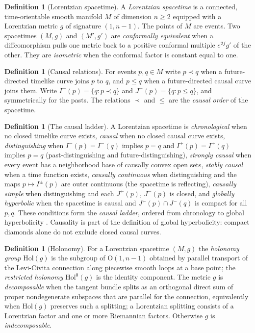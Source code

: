 \documentclass[11pt,letterpaper]{article}
\theoremstyle{definition}
\newtheorem{definition}[theorem]{Definition}
\theoremstyle{remark}
\begin{document}
\begin{definition}[Lorentzian spacetime]\label{def:spacetime}
A \emph{Lorentzian spacetime} is a connected, time-orientable smooth manifold $M$ of dimension $n \ge 2$ equipped with a Lorentzian metric $g$ of signature $(1, n-1)$. The points of $M$ are events. Two spacetimes $(M,g)$ and $(M',g')$ are \emph{conformally equivalent} when a diffeomorphism pulls one metric back to a positive conformal multiple $e^{2f} g'$ of the other. They are \emph{isometric} when the conformal factor is constant equal to one.
\end{definition}

\begin{definition}[Causal relations]\label{def:causal}
For events $p, q \in M$ write $p \prec q$ when a future-directed timelike curve joins $p$ to $q$, and $p \le q$ when a future-directed causal curve joins them. Write $I^+(p) = \{ q : p \prec q \}$ and $J^+(p) = \{ q : p \le q \}$, and symmetrically for the pasts. The relations $\prec$ and $\le$ are the \emph{causal order} of the spacetime.
\end{definition}

\begin{definition}[The causal ladder]\label{def:ladder}
A Lorentzian spacetime is \emph{chronological} when no closed timelike curve exists, \emph{causal} when no closed causal curve exists, \emph{distinguishing} when $I^-(p) = I^-(q)$ implies $p = q$ and $I^+(p) = I^+(q)$ implies $p = q$ (past-distinguishing and future-distinguishing), \emph{strongly causal} when every event has a neighborhood base of causally convex open sets, \emph{stably causal} when a time function exists, \emph{causally continuous} when distinguishing and the maps $p \mapsto I^{\pm}(p)$ are outer continuous (the spacetime is reflecting), \emph{causally simple} when distinguishing and each $J^+(p)$, $J^-(p)$ is closed, and \emph{globally hyperbolic} when the spacetime is causal and $J^+(p) \cap J^-(q)$ is compact for all $p, q$. These conditions form the \emph{causal ladder}, ordered from chronology to global hyperbolicity \cite{minguzzisanchez}. Causality is part of the definition of global hyperbolicity: compact diamonds alone do not exclude closed causal curves.
\end{definition}

\begin{definition}[Holonomy]\label{def:holonomy}
For a Lorentzian spacetime $(M,g)$ the \emph{holonomy group} $\mathrm{Hol}(g)$ is the subgroup of $\mathrm{O}(1,n-1)$ obtained by parallel transport of the Levi-Civita connection along piecewise smooth loops at a base point; the \emph{restricted holonomy} $\mathrm{Hol}^0(g)$ is the identity component. The metric $g$ is \emph{decomposable} when the tangent bundle splits as an orthogonal direct sum of proper nondegenerate subspaces that are parallel for the connection, equivalently when $\mathrm{Hol}(g)$ preserves such a splitting; a Lorentzian splitting consists of a Lorentzian factor and one or more Riemannian factors. Otherwise $g$ is \emph{indecomposable}.
\end{definition}
\end{document}
